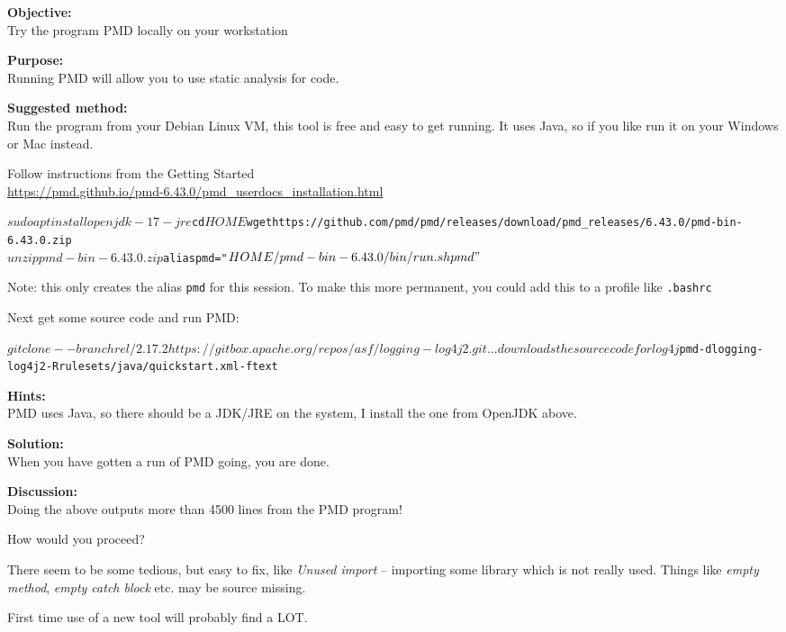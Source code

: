 \documentclass[a4paper,11pt,notitlepage]{report}
\begin{document}
{\bf Objective:}\\
Try the program PMD locally on your workstation


{\bf Purpose:}\\
Running PMD will allow you to use static analysis for code.

{\bf Suggested method:}\\
Run the program from your Debian Linux VM, this tool is free and easy to get running. It uses Java, so if you like run it on your Windows or Mac instead.

Follow instructions from the Getting Started\\
\url{https://pmd.github.io/pmd-6.43.0/pmd_userdocs_installation.html}

\begin{alltt}\footnotesize
$ sudo apt install openjdk-17-jre
$ cd $HOME
$ wget https://github.com/pmd/pmd/releases/download/pmd_releases/6.43.0/pmd-bin-6.43.0.zip
$ unzip pmd-bin-6.43.0.zip
$ alias pmd="$HOME/pmd-bin-6.43.0/bin/run.sh pmd"
$
\end{alltt}

Note: this only creates the alias \verb+pmd+ for this session. To make this more permanent, you could add this to a profile like \verb+.bashrc+

Next get some source code and run PMD:
\begin{alltt}\footnotesize
$ git clone --branch rel/2.17.2 https://gitbox.apache.org/repos/asf/logging-log4j2.git
... downloads the source code for log4j
$ pmd -d logging-log4j2 -R rulesets/java/quickstart.xml -f text
\end{alltt}


{\bf Hints:}\\
PMD uses Java, so there should be a JDK/JRE on the system, I install the one from OpenJDK above.

{\bf Solution:}\\
When you have gotten a run of PMD going, you are done.

{\bf Discussion:}\\
Doing the above outputs more than 4500 lines from the PMD program!

How would you proceed?

There seem to be some tedious, but easy to fix, like \emph{Unused import} -- importing some library which is not really used. Things like \emph{empty method}, \emph{empty catch block} etc. may be source missing.

First time use of a new tool will probably find a LOT.
\end{document}
